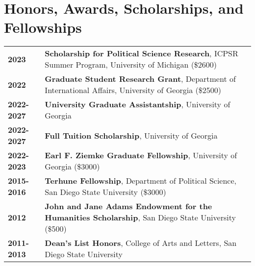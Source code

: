 \documentclass[letterpaper,12pt]{article}
\begin{document}
\section{Honors, Awards, Scholarships, and Fellowships}
\begin{tabularx}{\linewidth}{@{}l X@{}}
\textbf{2023} &  \textbf{Scholarship for Political Science Research}, ICPSR Summer Program, University of \mbox{Michigan} (\$2600)\\
\textbf{2022} & \textbf{Graduate Student Research Grant}, Department of International Affairs, University of Georgia (\$2500)\\
\textbf{2022-2027} &  \textbf{University Graduate Assistantship}, University of Georgia\\
\textbf{2022-2027} & \textbf{Full Tuition Scholarship}, University of Georgia\\
\textbf{2022-2023} & \textbf{Earl F. Ziemke Graduate Fellowship}, University of Georgia (\$3000)\\
\textbf{2015-2016} & \textbf{Terhune Fellowship}, Department of Political Science, San Diego State University (\$3000)\\
\textbf{2012} & \textbf{John and Jane Adams Endowment for the Humanities Scholarship}, San Diego State University (\$500)\\
\textbf{2011-2013} & \textbf{Dean's List Honors}, College of Arts and Letters, San Diego State University
\end{tabularx}

\end{document}
